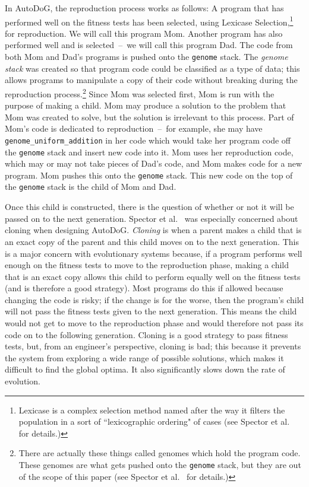 \documentclass{sig-alternate}
\begin{document}
In AutoDoG, the reproduction process works as follows:
A program that has performed well on the fitness tests has been selected, using Lexicase Selection,\footnote{Lexicase is a complex selection method named after the way it filters the population in a sort of ``lexicographic ordering" of cases (see Spector et al.~\cite{spector:2016} for details.)} for reproduction. We will call this program Mom. Another program has also performed well and is selected~--~we will call this program Dad. The code from both Mom and Dad's programs is pushed onto the \texttt{genome} stack. The \textit{genome stack} was created so that program code could be classified as a type of data; this allows programs to manipulate a copy of their code without breaking during the reproduction process.\footnote{There are actually these things called genomes which hold the program code. These genomes are what gets pushed onto the \texttt{genome} stack, but they are out of the scope of this paper (see Spector et al.~\cite{spector:2016} for details.)} Since Mom was selected first, Mom is run with the purpose of making a child. Mom may produce a solution to the problem that Mom was created to solve, but the solution is irrelevant to this process. Part of Mom's code is dedicated to reproduction~--~for example, she may have \texttt{genome\_uniform\_addition} in her code which would take her program code off the \texttt{genome} stack and insert new code into it. Mom uses her reproduction code, which may or may not take pieces of Dad's code, and Mom makes code for a new program. Mom pushes this onto the \texttt{genome} stack. This new code on the top of the \texttt{genome} stack is the child of Mom and Dad.

Once this child is constructed, there is the question of whether or not it will be passed on to the next generation. Spector et al.~\cite{spector:2016} was especially concerned about cloning when designing AutoDoG. \textit{Cloning} is when a parent makes a child that is an exact copy of the parent and this child moves on to the next generation. This is a major concern with evolutionary systems because, if a program performs well enough on the fitness tests to move to the reproduction phase, making a child that is an exact copy allows this child to perform equally well on the fitness tests (and is therefore a good strategy). Most programs do this if allowed because changing the code is risky; if the change is for the worse, then the program's child will not pass the fitness tests given to the next generation. This means the child would not get to move to the reproduction phase and would therefore not pass its code on to the following generation. Cloning is a good strategy to pass fitness tests, but, from an engineer's perspective, cloning is bad; this because it prevents the system from exploring a wide range of possible solutions, which makes it difficult to find the global optima. It also significantly slows down the rate of evolution.
\end{document}
